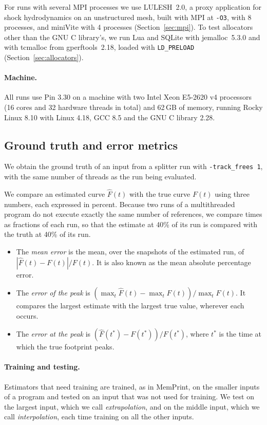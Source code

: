 \documentclass[11pt]{article}
\newcommand{\memprint}{MemPrint}
\newcommand{\knob}[1]{\texttt{-#1}}
\newcommand{\secref}[1]{Section~\ref{#1}}
\newcommand{\term}[1]{\emph{#1}}
\begin{document}
For runs with several MPI processes we use LULESH~2.0, a proxy application for shock hydrodynamics on an unstructured mesh, built with MPI at \texttt{-O3}, with 8 processes, and miniVite with 4 processes (\secref{sec:mpi}). To test allocators other than the GNU C library's, we run Lua and SQLite with jemalloc~5.3.0 and with tcmalloc from gperftools~2.18, loaded with \texttt{LD\_PRELOAD} (\secref{sec:allocators}).

\paragraph{Machine.}
All runs use Pin 3.30 on a machine with two Intel Xeon E5-2620 v4 processors (16 cores and 32 hardware threads in total) and 62\,GB of memory, running Rocky Linux 8.10 with Linux 4.18, GCC 8.5 and the GNU C library 2.28.

\subsection{Ground truth and error metrics}
\label{sec:metrics}

We obtain the ground truth of an input from a splitter run with \knob{track\_frees 1}, with the same number of threads as the run being evaluated.

We compare an estimated curve $\hat{F}(t)$ with the true curve $F(t)$ using three numbers, each expressed in percent. Because two runs of a multithreaded program do not execute exactly the same number of references, we compare times as fractions of each run, so that the estimate at 40\% of its run is compared with the truth at 40\% of its run.
\begin{itemize}
\item The \term{mean error} is the mean, over the snapshots of the estimated run, of $|\hat{F}(t) - F(t)|/F(t)$. It is also known as the mean absolute percentage error.
\item The \term{error of the peak} is $(\max_t \hat{F}(t) - \max_t F(t))/\max_t F(t)$. It compares the largest estimate with the largest true value, wherever each occurs.
\item The \term{error at the peak} is $(\hat{F}(t^*) - F(t^*))/F(t^*)$, where $t^*$ is the time at which the true footprint peaks.
\end{itemize}

\paragraph{Training and testing.}
Estimators that need training are trained, as in \memprint{}, on the smaller inputs of a program and tested on an input that was not used for training. We test on the largest input, which we call \term{extrapolation}, and on the middle input, which we call \term{interpolation}, each time training on all the other inputs.
\end{document}
